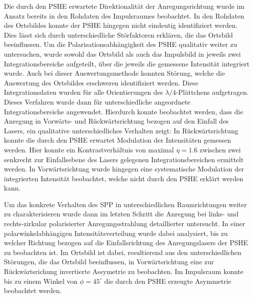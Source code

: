\documentclass[a4paper, titlepage,  ngerman]{book}
\begin{document}
	Die durch den PSHE erwartete Direktionalität der Anregungsrichtung wurde im Ansatz bereits in den Rohdaten des Impulsraumes beobachtet. In den Rohdaten des Ortsbildes konnte der PSHE hingegen nicht eindeutig identifiziert werden. Dies lässt sich durch unterschiedliche Störfaktoren erklären, die das Ortsbild beeinflussen. Um die Polarisationsabhängigkeit des PSHE qualitativ weiter zu untersuchen, wurde sowohl das Ortsbild als auch das Impulsbild in jeweils zwei Integrationsbereiche aufgeteilt, über die jeweils die gemessene Intensität integriert wurde. Auch bei dieser Auswertungsmethode konnten Störung, welche die Auswertung des Ortsbildes erschweren identifiziert werden. Diese Integrationsdaten wurden für alle Orientierungen des $\lambda/4$-Plättchens aufgetragen. Dieses Verfahren wurde dann für unterschiedliche angeordnete Integrationsbereiche angewendet. Hierdurch konnte beobachtet werden, dass die Anregung in Vorwärts- und Rückwärtsrichtung bezogen auf den Einfall des Lasers, ein qualitative unterschiedliches Verhalten zeigt: In Rückwärtsrichtung konnte die durch den PSHE erwartet Modulation der Intensitäten gemessen werden. Hier konnte ein Kontrastverhältnis von maximal $\eta = 1.6$ zwischen zwei senkrecht zur Einfallsebene des Lasers gelegenen Integrationsbereichen ermittelt werden. In Vorwärtsrichtung wurde hingegen eine systematische Modulation der integrierten Intensität beobachtet, welche nicht durch den PSHE erklärt werden kann.
	
	Um das konkrete Verhalten des SPP in unterschiedlichen Raumrichtungen weiter zu charakterisieren wurde dann im letzten Schritt die Anregung bei links- und rechts-zirkular polarisierter Anregungsstrahlung detaillierter untersucht. In einer polarwinkelabhängigen Intensitätsverteilung wurde dabei analysiert, bis zu welcher Richtung bezogen auf die Einfallsrichtung des Anregungslasers der PSHE zu beobachten ist. Im Ortsbild ist dabei, resultierend aus den unterschiedlichen Störungen, die das Ortsbild beeinflussen, in Vorwärtsrichtung eine zur Rückwärtsrichung invertierte Assymetrie zu beobachten. Im Impulsraum konnte bis zu einem Winkel von $\phi = 45^\circ$ die durch den PSHE erzeugte Asymmetrie beobachtet werden.
		
\end{document}

